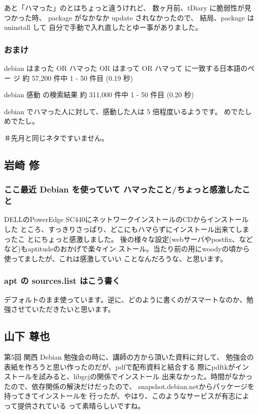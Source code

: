 \documentclass[mingoth,a4paper]{jsarticle}
\begin{document}
あと「ハマった」のとはちょっと違うけれど、
数ヶ月前、tDiary に脆弱性が見つかった時、
package がなかなか update されなかったので、
結局、package は uninstall して
自分で手動で入れ直したとゆー事がありました。

\subsubsection{おまけ}

debian はまった OR ハマった OR はまって OR ハマって に一致する日本語のペー
ジ 約 57,200 件中 1 - 50 件目 (0.19 秒) 

debian 感動 の検索結果 約 311,000 件中 1 - 50 件目 (0.20 秒) 

debian でハマった人に対して、感動した人は 5 倍程度いるようです。
めでたしめでたし。

＃先月と同じネタですいません。

\subsection{岩崎 修}

\subsubsection{ここ最近 Debian を使っていて ハマったこと/ちょっと感激したこと}
DELLのPowerEdge SC440にネットワークインストールのCDからインストールした
ところ、すっきりさっぱり、どこにもハマらずにインストール出来てしまったこ
とにちょっと感激しました。
後の様々な設定(webサーバやpostfix、などなど)もaptitudeのおかげで楽々イン
ストール。当たり前の用にwoodyの頃から使ってましたが、これは感激していい
ことなんだろうな、と思います。

\subsubsection{apt の sources.list はこう書く}
デフォルトのまま使っています。逆に、どのように書くのがスマートなのか、勉
強させていただきたいと思います。

\subsection{山下 尊也}

第5回 関西 Debian 勉強会の時に、講師の方から頂いた資料に対して、
勉強会の表紙を作ろうと思い作ったのだが、pdfで配布資料と結合する
際にpdftkがインストールを試みると、libgcjの関係でインストール
出来なかった。時間がなかったので、依存関係の解決だけだったので、
snapshot.debian.netからパッケージを持ってきてインストールを
行ったが、やはり、このようなサービスが有志によって提供されている
って素晴らしいですね。
\end{document}
